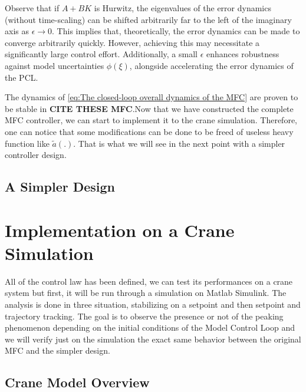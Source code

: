 Observe that if \( A + BK \) is Hurwitz, the eigenvalues of the error dynamics (without time-scaling) can be shifted arbitrarily far to the left of the imaginary axis as \( \epsilon \rightarrow 0 \). This implies that, theoretically, the error dynamics can be made to converge arbitrarily quickly. However, achieving this may necessitate a significantly large control effort. Additionally, a small \( \epsilon \) enhances robustness against model uncertainties \( \phi(\xi) \), alongside accelerating the error dynamics of the PCL.


The dynamics of \ref{eq:The closed-loop overall dynamics of the MFC} are proven to be stable in \textbf{CITE THESE MFC}.Now that we have constructed the complete MFC controller, we can start to implement it to the crane simulation. Therefore, one can notice that some modifications can be done to be freed of useless heavy function like \(\tilde{a}(.)\). That is what we will see in the next point with a simpler controller design.


\subsection{A Simpler Design}




\section{Implementation on a Crane Simulation}

All of the control law has been defined, we can test its performances on a crane system but first, it will be run through a simulation on Matlab Simulink. The analysis is done in three situation, stabilizing on a setpoint and then setpoint and trajectory tracking. The goal is to observe the presence or not of the peaking phenomenon depending on the initial conditions of the Model Control Loop and we will verify just on the simulation the exact same behavior between the original MFC and the simpler design. 

\subsection{Crane Model Overview}

